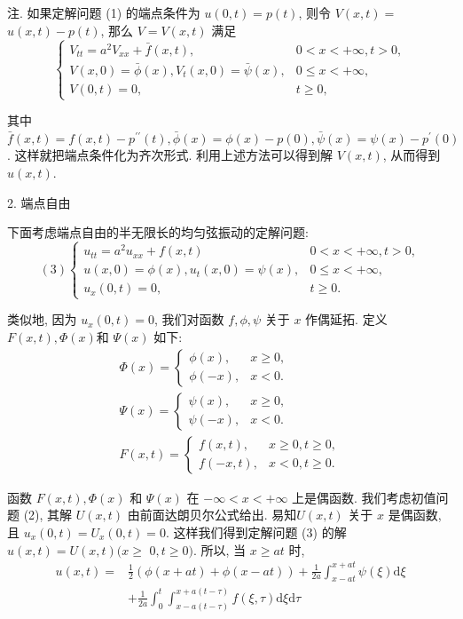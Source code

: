 注. 如果定解问题 (1) 的端点条件为 $ u(0, t)=p(t) $, 则令 $ V(x, t)= $ $ u(x, t)-p(t) $, 那么 $ V=V(x, t) $ 满足
$$
\left\{\begin{array}{ll}
V_{t t}=a^{2} V_{x x}+\bar{f}(x, t), & 0<x<+\infty, t>0, \\
V(x, 0)=\bar{\phi}(x), V_{t}(x, 0)=\bar{\psi}(x), & 0 \leqslant x<+\infty, \\
V(0, t)=0, & t \geqslant 0,
\end{array}\right.
$$

其中 $ \bar{f}(x, t)=f(x, t)-p^{\prime \prime}(t), \bar{\phi}(x)=\phi(x)-p(0), \bar{\psi}(x)=\psi(x)-p^{\prime}(0) $. 这样就把端点条件化为齐次形式. 利用上述方法可以得到解 $ V(x, t) $, 从而得到 $ u(x, t) $.

2. 端点自由

下面考虑端点自由的半无限长的均匀弦振动的定解问题:
$$
(3)\left\{\begin{array}{ll}
u_{t t}=a^{2} u_{x x}+f(x, t) & 0<x<+\infty, t>0, \\
u(x, 0)=\phi(x), u_{t}(x, 0)=\psi(x), & 0 \leqslant x<+\infty, \\
u_{x}(0, t)=0, & t \geqslant 0 .
\end{array}\right.
$$

类似地, 因为 $ u_{x}(0, t)=0 $, 我们对函数 $ f, \phi, \psi $ 关于 $ x $ 作偶延拓. 定义 $ F(x, t), \Phi(x) $和 $ \Psi(x) $ 如下:
$$
\begin{array}{l}
\Phi(x)=\left\{\begin{array}{ll}
\phi(x), & x \geqslant 0, \\
\phi(-x), & x<0 .
\end{array}\right. \\
\Psi(x)=\left\{\begin{array}{ll}
\psi(x), & x \geqslant 0, \\
\psi(-x), & x<0 .
\end{array}\right. \\
F(x, t)=\left\{\begin{array}{ll}
f(x, t), & x \geqslant 0, t \geqslant 0, \\
f(-x, t), & x<0, t \geqslant 0 .
\end{array}\right.
\end{array}
$$

函数 $ F(x, t), \Phi(x) $ 和 $ \Psi(x) $ 在 $ -\infty<x<+\infty $ 上是偶函数. 我们考虑初值问题 (2), 其解 $ U(x, t) $ 由前面达朗贝尔公式给出.  易知$ U(x, t) $ 关于 $ x $ 是偶函数, 且 $ u_{x}(0, t)=U_{x}(0, t)=0 $. 这样我们得到定解问题 (3) 的解 $ u(x, t)=U(x, t)(x \geqslant $ $ 0, t \geqslant 0) $. 所以, 当 $ x \geqslant a t $ 时,
$$
\begin{aligned}
u(x, t)= & \frac{1}{2}(\phi(x+a t)+\phi(x-a t))+\frac{1}{2 a} \int_{x-a t}^{x+a t} \psi(\xi) \mathrm{d} \xi \\
& +\frac{1}{2 a} \int_{0}^{t} \int_{x-a(t-\tau)}^{x+a(t-\tau)} f(\xi, \tau) \mathrm{d} \xi \mathrm{d} \tau
\end{aligned}
$$

